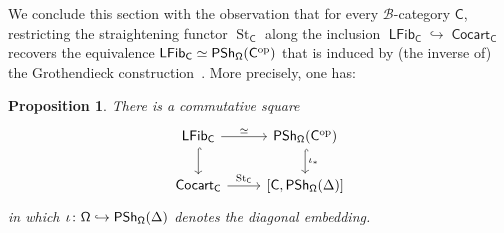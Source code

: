 \documentclass[reqno]{amsart}
\numberwithin{equation}{subsection}
\theoremstyle{plain}
\newtheorem{proposition}[equation]{Proposition}
\theoremstyle{definition}
\let\scr=\mathcal
\let\into=\hookrightarrow
\def\BB{\scr B}
\DeclareMathOperator{\IPSh}{\mathsf{PSh}}
\DeclareMathOperator{\ICocart}{\mathsf{Cocart}}
\DeclareMathOperator{\ILFib}{\mathsf{LFib}}
\DeclareMathOperator{\St}{St}
\newcommand{\op}{\mathrm{op}}
\newcommand{\I}[1]{\mathsf{#1}}
\newcommand{\iFun}[2]{{[#1,#2]}}
\begin{document}
We conclude this section with the observation that for every $\BB$-category $\I{C}$, restricting the straightening functor $\St_{\I{C}}$ along the inclusion $\ILFib_{\I{C}}\into\ICocart_{\I{C}}$ recovers the equivalence $\ILFib_{\I{C}}\simeq\IPSh_{\Univ}(\I{C}^{\op})$ that is induced by (the inverse of) the Grothendieck construction~\cite[Theorem~4.5.1]{Martini2021}. More precisely, one has:
\begin{proposition}
	\label{prop:StraighteningGrothendieckConstruction}
	There is a commutative square
	\begin{equation*}
	\begin{tikzcd}
	\ILFib_{\I{C}}\arrow[d, hookrightarrow]\arrow[r, "\simeq"] & \IPSh_{\Univ}(\I{C}^{\op})\arrow[d, "\iota_\ast", hookrightarrow]\\
	\ICocart_{\I{C}}\arrow[r, "\St_{\I{C}}"] & \iFun{\I{C}}{\IPSh_{\Univ}(\Delta)}
	\end{tikzcd}
	\end{equation*}
	in which $\iota\colon \Univ\into\IPSh_{\Univ}(\Delta)$ denotes the diagonal embedding.
\end{proposition}
\end{document}
